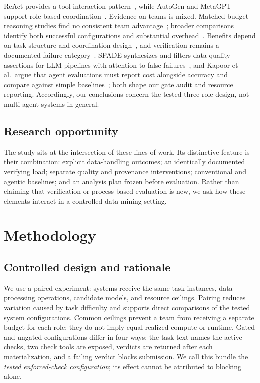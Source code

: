 \documentclass[conference]{IEEEtran}
\begin{document}
ReAct provides a tool-interaction pattern~\cite{yao2023react}, while AutoGen and MetaGPT support role-based coordination~\cite{wu2023autogen,hong2024metagpt}. Evidence on teams is mixed. Matched-budget reasoning studies find no consistent team advantage~\cite{tran2026single,dylan2026equalcost}; broader comparisons identify both successful configurations and substantial overhead~\cite{fu2026moreagents,jwalapuram2026illusion}. Benefits depend on task structure and coordination design~\cite{kim2025scaling}, and verification remains a documented failure category~\cite{cemri2025mas}. SPADE synthesizes and filters data-quality assertions for LLM pipelines with attention to false failures~\cite{shankar2024spade}, and Kapoor et al.\ argue that agent evaluations must report cost alongside accuracy and compare against simple baselines~\cite{kapoor2024agentsmatter}; both shape our gate audit and resource reporting. Accordingly, our conclusions concern the tested three-role design, not multi-agent systems in general.



\subsection{Research opportunity}
The study sits at the intersection of these lines of work. Its distinctive feature is their combination: explicit data-handling outcomes; an identically documented verifying load; separate quality and provenance interventions; conventional and agentic baselines; and an analysis plan frozen before evaluation. Rather than claiming that verification or process-based evaluation is new, we ask how these elements interact in a controlled data-mining setting.

\section{Methodology}
\label{sec:method}
\subsection{Controlled design and rationale}
We use a paired experiment: systems receive the same task instances, data-processing operations, candidate models, and resource ceilings. Pairing reduces variation caused by task difficulty and supports direct comparisons of the tested system configurations. Common ceilings prevent a team from receiving a separate budget for each role; they do not imply equal realized compute or runtime. Gated and ungated configurations differ in four ways: the task text names the active checks, two check tools are exposed, verdicts are returned after each materialization, and a failing verdict blocks submission. We call this bundle the \emph{tested enforced-check configuration}; its effect cannot be attributed to blocking alone.
\end{document}
